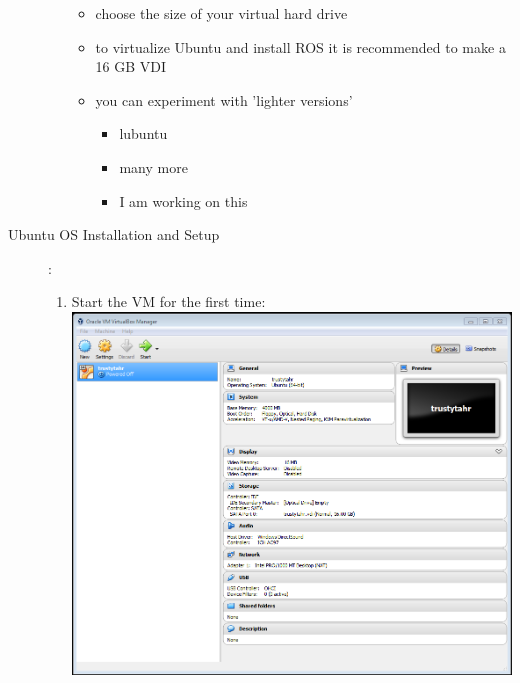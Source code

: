 \documentclass[12pt]{article}
\begin{document}
\begin{description}
\begin{enumerate}
\begin{itemize}
                \item choose the size of your virtual hard drive       
                \item to virtualize Ubuntu and install ROS it is recommended to make a 16 GB VDI
                \item  you can experiment with 'lighter versions' 
          
                    \begin{itemize}
                            
                        \item lubuntu     
                        \item many more
                        \item I am working on this
                        
                    \end{itemize}
                
            \end{itemize}
	\newpage

\end{enumerate}

		\item[Ubuntu OS Installation and Setup]: \vspace{20mm} \\

\begin{enumerate}
\item Start the VM for the first time: \vspace{20mm} \\
      		\hspace*{-2.5cm}\includegraphics[scale=.6]{Capture7.png}\\
            \begin{itemize}
                    

\end{itemize}
\end{enumerate}
\end{description}
\end{document}
